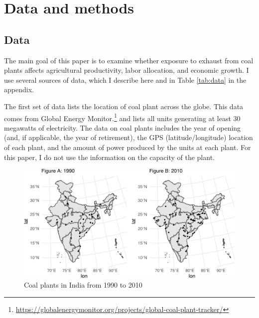 \documentclass[
]{article}
\begin{document}
\hypertarget{data-and-methods}{%
\section{\texorpdfstring{Data and methods \label{data}}{Data and methods }}\label{data-and-methods}}

\hypertarget{data}{%
\subsection{\texorpdfstring{Data \label{data2}}{Data }}\label{data}}

The main goal of this paper is to examine whether exposure to exhaust from coal plants affects agricultural productivity, labor allocation, and economic growth. I use several sources of data, which I describe here and in Table \ref{tab:data} in the appendix.

The first set of data lists the location of coal plant across the globe. This data comes from Global Energy Monitor.\footnote{\url{https://globalenergymonitor.org/projects/global-coal-plant-tracker/}} and lists all units generating at least 30 megawatts of electricity. The data on coal plants includes the year of opening (and, if applicable, the year of retirement), the GPS (latitude/longitude) location of each plant, and the amount of power produced by the units at each plant. For this paper, I do not use the information on the capacity of the plant.

\begin{figure}
\includegraphics{draft_files/figure-latex/plants-1} \caption[Coal plants in India from 1990 to 2010]{Coal plants in India from 1990 to 2010}\label{fig:plants}
\end{figure}
\end{document}
